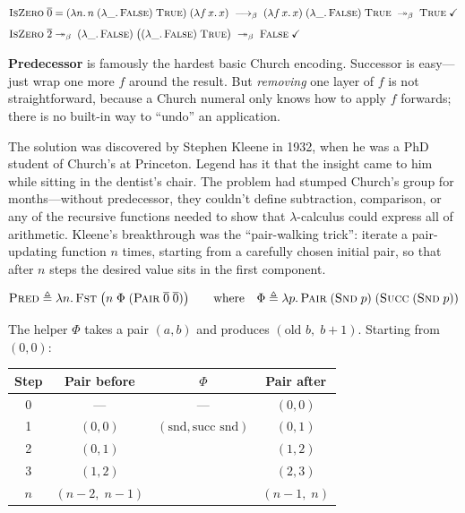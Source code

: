 \documentclass[11pt,a4paper]{article}
\theoremstyle{definition}
\newcommand{\lam}{\lambda}
\newcommand{\reduce}{\longrightarrow_\beta}
\newcommand{\reduces}{\twoheadrightarrow_\beta}
\newcommand{\church}[1]{\overline{#1}}
\newcommand{\TR}{\textsc{True}}
\newcommand{\FL}{\textsc{False}}
\begin{document}
\begin{workedexample}[$\textsc{IsZero}\;\church{0} = \TR$ and $\textsc{IsZero}\;\church{2} = \FL$]
\begin{align*}
  \textsc{IsZero}\;\church{0}
  &= (\lam n.\, n\;(\lam \_.\,\FL)\;\TR)\;(\lam f\,x.\,x)
  \;\reduce\; (\lam f\,x.\,x)\;(\lam \_.\,\FL)\;\TR
  \;\reduces\; \TR \;\checkmark \\[4pt]
  \textsc{IsZero}\;\church{2}
  &\reduces\; (\lam \_.\,\FL)\;\bigl((\lam \_.\,\FL)\;\TR\bigr)
  \;\reduces\; \FL \;\checkmark
\end{align*}
\end{workedexample}

\textbf{Predecessor} is famously the hardest basic Church encoding. Successor
is easy---just wrap one more $f$ around the result. But \emph{removing} one
layer of $f$ is not straightforward, because a Church numeral only knows how to
apply $f$ forwards; there is no built-in way to ``undo'' an application.

The solution was discovered by Stephen Kleene in 1932, when he was a PhD
student of Church's at Princeton. Legend has it that the insight came to him
while sitting in the dentist's chair. The problem had stumped Church's group
for months---without predecessor, they couldn't define subtraction, comparison,
or any of the recursive functions needed to show that $\lam$-calculus could
express all of arithmetic. Kleene's breakthrough was the ``pair-walking
trick'': iterate a pair-updating function $n$ times,
starting from a carefully chosen initial pair, so that after $n$ steps the
desired value sits in the first component.

\[
\textsc{Pred} \triangleq \lam n.\, \textsc{Fst}\;\bigl(
  n\;\Phi\;(\textsc{Pair}\;\church{0}\;\church{0})
\bigr)
\qquad\text{where}\quad
\Phi \triangleq \lam p.\, \textsc{Pair}\;(\textsc{Snd}\;p)\;(\textsc{Succ}\;(\textsc{Snd}\;p))
\]

The helper $\Phi$ takes a pair $(a, b)$ and produces $(\text{old } b,\;
b + 1)$. Starting from $(0, 0)$:

\begin{center}
\renewcommand{\arraystretch}{1.3}
\begin{tabular}{cccc}
\textbf{Step} & \textbf{Pair before} & $\Phi$ & \textbf{Pair after} \\
\hline
0 & --- & --- & $(0, 0)$ \\
1 & $(0, 0)$ & $(\text{snd}, \text{succ snd})$ & $(0, 1)$ \\
2 & $(0, 1)$ & & $(1, 2)$ \\
3 & $(1, 2)$ & & $(2, 3)$ \\
$n$ & $(n{-}2,\; n{-}1)$ & & $(n{-}1,\; n)$ \\
\end{tabular}
\end{center}
\end{document}
